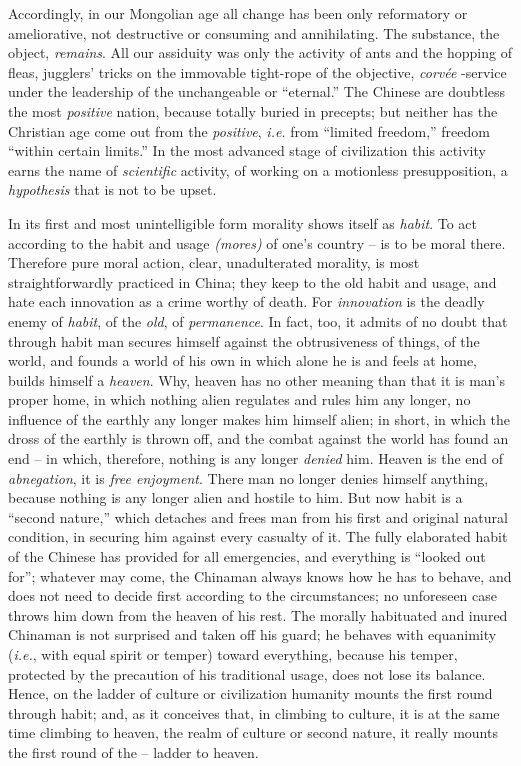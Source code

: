 \documentclass[12pt,a4paper]{book}
\begin{document}
Accordingly, in our Mongolian age all change has been only reformatory or 
ameliorative, not destructive or consuming and annihilating. The substance, 
the object, \textit{remains}. All our assiduity was only the activity of ants 
and the hopping of fleas, jugglers' tricks on the immovable tight-rope of the 
objective, \textit{corv\'ee} -service under the leadership of the unchangeable 
or ``eternal.'' The Chinese are doubtless the most \textit{positive} nation, 
because totally buried in precepts; but neither has the Christian age come out 
from the \textit{positive}, \textit{i.e.} from ``limited freedom,'' freedom 
``within certain limits.'' In the most advanced stage of civilization this 
activity earns the name of \textit{scientific} activity, of working on a 
motionless presupposition, a \textit{hypothesis} that is not to be upset.

In its first and most unintelligible form morality shows itself as 
\textit{habit}. To act according to the habit and usage \textit{(mores)} of 
one's country -- is to be moral there. Therefore pure moral action, clear, 
unadulterated morality, is most straightforwardly practiced in China; they 
keep to the old habit and usage, and hate each innovation as a crime worthy of 
death. For \textit{innovation} is the deadly enemy of \textit{habit}, of the 
\textit{old}, of \textit{permanence}. In fact, too, it admits of no doubt that 
through habit man secures himself against the obtrusiveness of things, of the 
world, and founds a world of his own in which alone he is and feels at home, 
builds himself a \textit{heaven}. Why, heaven has no other meaning than that 
it is man's proper home, in which nothing alien regulates and rules him any 
longer, no influence of the earthly any longer makes him himself alien; in 
short, in which the dross of the earthly is thrown off, and the combat against 
the world has found an end -- in which, therefore, nothing is any longer 
\textit{denied} him. Heaven is the end of \textit{abnegation}, it is 
\textit{free enjoyment}. There man no longer denies himself anything, because 
nothing is any longer alien and hostile to him. But now habit is a ``second 
nature,'' which detaches and frees man from his first and original natural 
condition, in securing him against every casualty of it. The fully elaborated 
habit of the Chinese has provided for all emergencies, and everything is 
``looked out for''; whatever may come, the Chinaman always knows how he has 
to behave, and does not need to decide first according to the circumstances; 
no unforeseen case throws him down from the heaven of his rest. The morally 
habituated and inured Chinaman is not surprised and taken off his guard; he 
behaves with equanimity (\textit{i.e.}, with equal spirit or temper) toward 
everything, because his temper, protected by the precaution of his traditional 
usage, does not lose its balance. Hence, on the ladder of culture or 
civilization humanity mounts the first round through habit; and, as it 
conceives that, in climbing to culture, it is at the same time climbing to 
heaven, the realm of culture or second nature, it really mounts the first 
round of the -- ladder to heaven.
\end{document}
